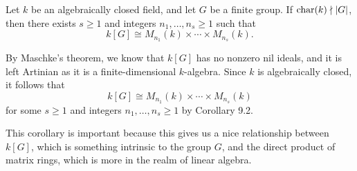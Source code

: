 \begin{cor}
Let $k$ be an algebraically closed field, and let $G$ be a finite group. If $\operatorname{char}(k) \nmid |G|$, then 
there exists $s \geq 1$ and integers $n_1, \dots, n_s \geq 1$ such that 
\[ k[G] \cong M_{n_1}(k) \times \cdots \times M_{n_s}(k). \]
\end{cor}
\begin{pf}
By Maschke's theorem, we know that $k[G]$ has no nonzero nil ideals, and it is left Artinian 
as it is a finite-dimensional $k$-algebra. Since $k$ is algebraically closed, it follows that 
\[ k[G] \cong M_{n_1}(k) \times \cdots \times M_{n_s}(k) \]
for some $s \geq 1$ and integers $n_1, \dots, n_s \geq 1$ by Corollary 9.2. 
\end{pf}

This corollary is important because this gives us a nice relationship between $k[G]$, which is 
something intrinsic to the group $G$, and the direct product of matrix rings, which is more in the 
realm of linear algebra.